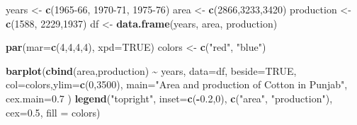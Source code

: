 \documentclass[]{article}
\newenvironment{Shaded}{\begin{snugshade}}{\end{snugshade}}
\newcommand{\DataTypeTok}[1]{\textcolor[rgb]{0.13,0.29,0.53}{#1}}
\newcommand{\DecValTok}[1]{\textcolor[rgb]{0.00,0.00,0.81}{#1}}
\newcommand{\FloatTok}[1]{\textcolor[rgb]{0.00,0.00,0.81}{#1}}
\newcommand{\KeywordTok}[1]{\textcolor[rgb]{0.13,0.29,0.53}{\textbf{#1}}}
\newcommand{\NormalTok}[1]{#1}
\newcommand{\OperatorTok}[1]{\textcolor[rgb]{0.81,0.36,0.00}{\textbf{#1}}}
\newcommand{\OtherTok}[1]{\textcolor[rgb]{0.56,0.35,0.01}{#1}}
\newcommand{\StringTok}[1]{\textcolor[rgb]{0.31,0.60,0.02}{#1}}
\begin{document}
\begin{Shaded}
\begin{Highlighting}[]
\NormalTok{years \textless{}{-}}\StringTok{ }\KeywordTok{c}\NormalTok{(}\StringTok{\textquotesingle{}1965{-}66\textquotesingle{}}\NormalTok{, }\StringTok{\textquotesingle{}1970{-}71\textquotesingle{}}\NormalTok{, }\StringTok{\textquotesingle{}1975{-}76\textquotesingle{}}\NormalTok{)}
\NormalTok{area \textless{}{-}}\StringTok{ }\KeywordTok{c}\NormalTok{(}\DecValTok{2866}\NormalTok{,}\DecValTok{3233}\NormalTok{,}\DecValTok{3420}\NormalTok{)}
\NormalTok{production \textless{}{-}}\StringTok{ }\KeywordTok{c}\NormalTok{(}\DecValTok{1588}\NormalTok{, }\DecValTok{2229}\NormalTok{,}\DecValTok{1937}\NormalTok{)}
\NormalTok{df \textless{}{-}}\StringTok{ }\KeywordTok{data.frame}\NormalTok{(years, area, production)}

\KeywordTok{par}\NormalTok{(}\DataTypeTok{mar=}\KeywordTok{c}\NormalTok{(}\DecValTok{4}\NormalTok{,}\DecValTok{4}\NormalTok{,}\DecValTok{4}\NormalTok{,}\DecValTok{4}\NormalTok{), }\DataTypeTok{xpd=}\OtherTok{TRUE}\NormalTok{)}
\NormalTok{colors \textless{}{-}}\StringTok{ }\KeywordTok{c}\NormalTok{(}\StringTok{"red"}\NormalTok{, }\StringTok{"blue"}\NormalTok{)}

\KeywordTok{barplot}\NormalTok{(}\KeywordTok{cbind}\NormalTok{(area,production) }\OperatorTok{\textasciitilde{}}\StringTok{ }\NormalTok{years,  }
         \DataTypeTok{data=}\NormalTok{df, }\DataTypeTok{beside=}\OtherTok{TRUE}\NormalTok{,  }
         \DataTypeTok{col=}\NormalTok{colors,}\DataTypeTok{ylim=}\KeywordTok{c}\NormalTok{(}\DecValTok{0}\NormalTok{,}\DecValTok{3500}\NormalTok{),}
         \DataTypeTok{main=}\StringTok{"Area and production of Cotton in Punjab"}\NormalTok{,}
        \DataTypeTok{cex.main=}\FloatTok{0.7}
\NormalTok{       )}
\KeywordTok{legend}\NormalTok{(}\StringTok{"topright"}\NormalTok{, }\DataTypeTok{inset=}\KeywordTok{c}\NormalTok{(}\OperatorTok{{-}}\FloatTok{0.2}\NormalTok{,}\DecValTok{0}\NormalTok{), }
       \KeywordTok{c}\NormalTok{(}\StringTok{"area"}\NormalTok{, }\StringTok{"production"}\NormalTok{), }\DataTypeTok{cex=}\FloatTok{0.5}\NormalTok{,  }\DataTypeTok{fill =}\NormalTok{ colors)}
\end{Highlighting}
\end{Shaded}
\end{document}
